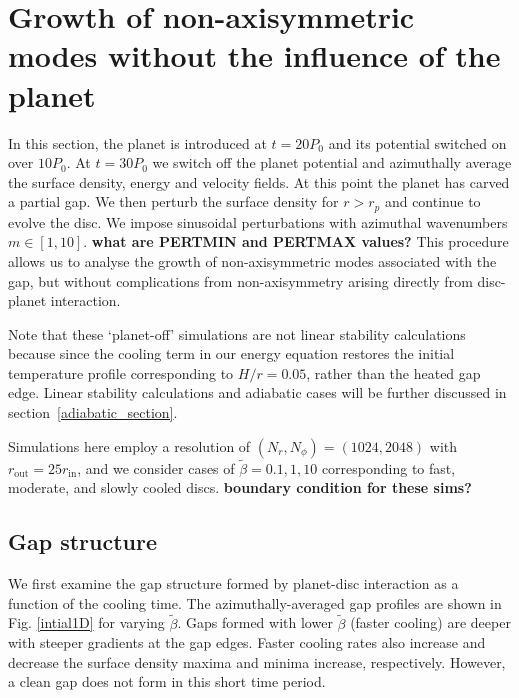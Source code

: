 \section{Growth of non-axisymmetric modes without the influence of the
  planet}\label{linear1}
In this section, the planet is introduced at $t=20P_0$ and 
its potential switched on over $10P_0$. At $t=30P_0$ we switch off the
planet potential and azimuthally average the surface density, energy
and velocity fields. At this point the planet has carved a partial
gap. We then perturb the surface density for $r>r_p$ and continue to 
evolve the disc. We impose  sinusoidal perturbations with 
azimuthal wavenumbers $m\in[1,10]$. {\bf what are PERTMIN and PERTMAX values?}  
This procedure allows us to analyse the growth of 
non-axisymmetric modes associated with the gap, but without
complications from non-axisymmetry arising directly from disc-planet
interaction.

Note that these `planet-off' simulations are not linear stability
calculations because since the cooling term in our energy equation
restores the initial temperature profile corresponding to $H/r=0.05$,
rather than the heated gap edge. Linear stability calculations and
adiabatic cases will be further discussed in
section~\ref{adiabatic_section}.  


Simulations here employ a resolution of $(N_r,N_{\phi})=(1024,2048)$
with $r_\mathrm{out}=25r_\mathrm{in}$, 
and we consider 
cases of $\tilde{\beta}=0.1,1,10$ corresponding to fast, moderate,
and slowly cooled discs.  {\bf boundary condition for these sims?}

\subsection{Gap structure}
We first examine the gap structure formed by planet-disc
interaction as a function of the cooling time. The azimuthally-averaged 
gap profiles are shown in Fig. \ref{intial1D} for varying
$\tilde\beta$. Gaps formed with lower $\tilde\beta$ (faster cooling)
are deeper with steeper gradients at the gap edges. Faster cooling rates also 
increase and decrease the surface density maxima and 
minima increase, respectively. However, a clean gap does not form
in this short time period. 


